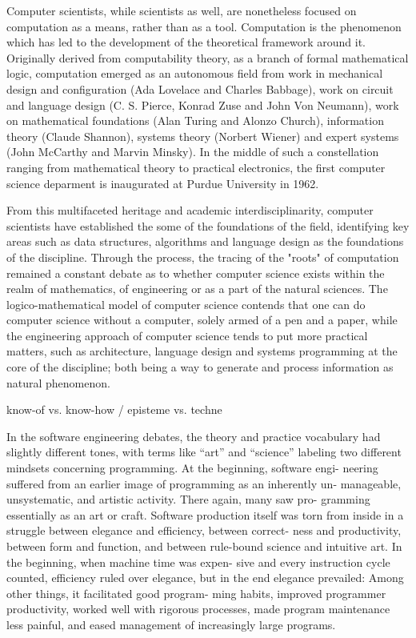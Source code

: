 {%
Computer scientists, while scientists as well, are nonetheless focused on computation as a means, rather than as a tool. Computation is the phenomenon which has led to the development of the theoretical framework around it. Originally derived from computability theory, as a branch of formal mathematical logic, computation emerged as an autonomous field from work in mechanical design and configuration (Ada Lovelace and Charles Babbage),  work on circuit and language design (C. S. Pierce, Konrad Zuse and John Von Neumann), work on mathematical foundations (Alan Turing and Alonzo Church), information theory (Claude Shannon), systems theory (Norbert Wiener) and expert systems (John McCarthy and Marvin Minsky)\cite{ifrah_universal_2001}. In the middle of such a constellation ranging from mathematical theory to practical electronics, the first computer science deparment is inaugurated at Purdue University in 1962.

From this multifaceted heritage and academic interdisciplinarity, computer scientists have established the some of the foundations of the field, identifying key areas such as data structures, algorithms and language design as the foundations of the discipline\cite{wirth_algorithms_1976}. Through the process, the tracing of the "roots" of computation remained a constant debate as to whether computer science exists within the realm of mathematics, of engineering or as a part of the natural sciences. The logico-mathematical model of computer science contends that one can do computer science without a computer, solely armed of a pen and a paper, while the engineering approach of computer science tends to put more practical matters, such as architecture, language design and systems programming at the core of the discipline; both being a way to generate and process information as natural phenomenon\cite{tedre_development_2006}.

know-of vs. know-how / episteme vs. techne

In the software engineering debates, the theory and practice vocabulary
had slightly different tones, with terms like “art” and “science” labeling two
different mindsets concerning programming. At the beginning, software engi-
neering suffered from an earlier image of programming as an inherently un-
manageable, unsystematic, and artistic activity. There again, many saw pro-
gramming essentially as an art or craft. Software production itself was torn
from inside in a struggle between elegance and efficiency, between correct-
ness and productivity, between form and function, and between rule-bound
science and intuitive art. In the beginning, when machine time was expen-
sive and every instruction cycle counted, efficiency ruled over elegance, but in
the end elegance prevailed: Among other things, it facilitated good program-
ming habits, improved programmer productivity, worked well with rigorous
processes, made program maintenance less painful, and eased management of
increasingly large programs.

}
